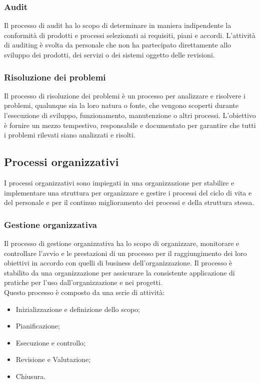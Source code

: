 \subsubsection{Audit}
Il processo di audit ha lo scopo di determinare in maniera indipendente la conformità di prodotti e processi selezionati ai requisiti, piani e accordi. L'attività di auditing è svolta da personale che non ha partecipato direttamente allo sviluppo dei prodotti, dei servizi o dei sistemi oggetto delle revisioni.

\subsubsection{Risoluzione dei problemi}
Il processo di risoluzione dei problemi è un processo per analizzare e risolvere i problemi, qualunque sia la loro natura o fonte, che vengono scoperti durante l'esecuzione di sviluppo, funzionamento, manutenzione o altri processi. L'obiettivo è fornire un mezzo tempestivo, responsabile e documentato per garantire che tutti i problemi rilevati siano analizzati e risolti.

\subsection{Processi organizzativi}
I processi organizzativi sono impiegati in  una organizzazione per stabilire e implementare una struttura per organizzare  e gestire i processi del ciclo di vita e  del personale e per il continuo miglioramento dei processi e della struttura stessa.

\subsubsection{Gestione organizzativa}
Il processo di gestione organizzativa ha lo scopo di organizzare, monitorare e controllare l'avvio e le prestazioni di un processo per il raggiungimento dei loro obiettivi in accordo con quelli di business dell'organizzazione. Il processo è stabilito da una organizzazione per assicurare la consistente applicazione di pratiche per l'uso dall'organizzazione e nei progetti.\\
Questo processo è composto da una serie di attività:
\begin{itemize}
	\item Inizializzazione e definizione dello scopo;
	
	\item Pianificazione;
	
	\item Esecuzione e controllo;
	
	\item Revisione e Valutazione;
	
	\item Chiusura.
\end{itemize}


